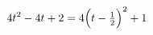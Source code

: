 \documentclass[preview]{standalone}
\begin{document}
\begin{align*}
\special{dvisvgm:raw <g id='unique000'>}4t^2-4t+2=4\Big(t-\tfrac{1}{2}\Big)^2+1\special{dvisvgm:raw </g>}
\end{align*}
\end{document}
